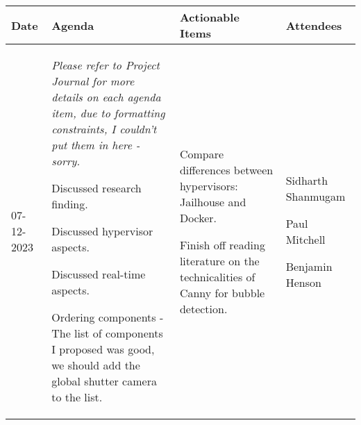 \begin{table}[!h]
    \centering
    \begin{tabularx}{\textwidth}{|l|X|X|X|}
        \hline
        Date & Agenda & Actionable Items & Attendees \\
        \hline
        \hline
        07-12-2023 & 
        \textit{Please refer to Project Journal for more details on each agenda item, due to formatting constraints, I couldn't put them in here - sorry.}
        \begin{myitemize}
            \item Discussed research finding.
            \item Discussed hypervisor aspects.
            \item Discussed real-time aspects.
            \item Ordering components - The list of components I proposed was good, we should add the global shutter camera to the list.
        \end{myitemize} &
        \begin{myitemize}
            \item Compare differences between hypervisors: Jailhouse and Docker.
            \item Finish off reading literature on the technicalities of Canny for bubble detection.
        \end{myitemize} &
        \begin{myitemize}
            \item Sidharth Shanmugam
            \item Paul Mitchell
            \item Benjamin Henson
        \end{myitemize} \\
        \hline
    \end{tabularx}
\end{table}
